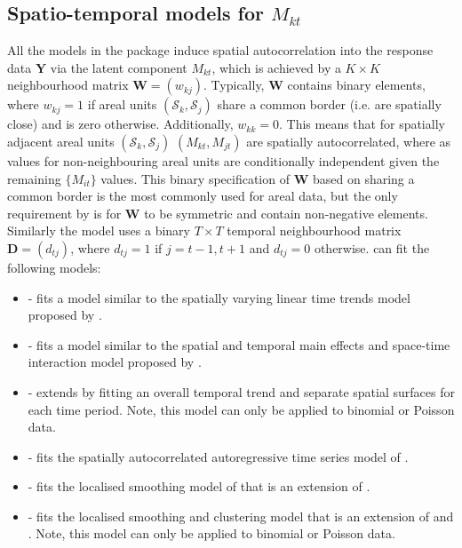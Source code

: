 \documentclass[article,shortnames,nojss]{jss}
\begin{document}
\subsection{Spatio-temporal models for $M_{kt}$}
All the models in the package induce spatial autocorrelation into the response data $\mathbf{Y}$ via the latent component $M_{kt}$, which is achieved by a $K\times K$ neighbourhood matrix $\mathbf{W}=(w_{kj})$. Typically, $\mathbf{W}$ contains binary elements, where $w_{kj}=1$ if areal units $(\mathcal{S}_k, \mathcal{S}_j)$ share a common border (i.e. are spatially close) and is zero otherwise. Additionally, $w_{kk}=0$. This means that for spatially adjacent areal units $(\mathcal{S}_k, \mathcal{S}_j)$  $(M_{kt}, M_{jt})$ are spatially autocorrelated, where as values for non-neighbouring areal units are conditionally independent given the remaining $\{M_{it}\}$ values. This binary specification of $\mathbf{W}$ based on sharing a common border is the most commonly used for areal data, but the only requirement by  is for $\mathbf{W}$ to be symmetric and contain non-negative elements. Similarly the model  uses a binary $T\times T$ temporal neighbourhood matrix $\mathbf{D}=(d_{tj})$, where $d_{tj}=1$ if $j=t-1, t+1$ and $d_{tj}=0$ otherwise.  can fit the following models:

\begin{itemize}
\item {} - fits a model similar to the spatially varying linear time trends model proposed by \cite{bernardinelli1995}.

\item {} - fits a model similar to the spatial and temporal main effects and space-time interaction  model proposed by \cite{knorrheld2000}.

\item {} - extends  by fitting an overall temporal trend and separate spatial surfaces for each time period. Note, this model can only be applied to binomial or Poisson data.

\item {} - fits the spatially autocorrelated autoregressive time series model of \cite{rushworth2014}.

\item {} - fits the localised smoothing model of \cite{rushworth2014b} that is an extension of \cite{rushworth2014}.

\item {} - fits the localised smoothing and clustering model that is an extension of \cite{rushworth2014} and \cite{lee2015b}. Note, this model can only be applied to binomial or Poisson data.
\end{itemize}
\end{document}

